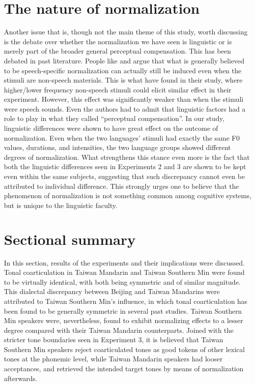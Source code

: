 \section{The nature of normalization}\label{section:General perceptual compensation vs. speech-specific normalization}

\vspace{2cm}
\vspace{-2cm}

Another issue that is, though not the main theme of this study, worth discussing is the debate over whether the normalization we have seen is linguistic or is merely part of the broader general perceptual compensation. This has been debated in past literature. People like \cite{WatkinsMakin1994} and \cite{Zhangetal2022} argue that what is generally believed to be speech-specific normalization can actually still be induced even when the stimuli are non-speech materials. This is what \citeauthor{Zhangetal2022} have found in their study, where higher/lower frequency non-speech stimuli could elicit similar effect in their experiment. However, this effect was significantly weaker than when the stimuli were speech sounds. Even the authors had to admit that linguistic factors had a role to play in what they called ``perceptual compensation''. In our study, linguistic differences were shown to have great effect on the outcome of normalization. Even when the two languages' stimuli had exactly the same F0 values, durations, and intensities, the two language groups showed different degrees of normalization. What strengthens this stance even more is the fact that both the linguistic differences seen in Experiments 2 and 3 are shown to be kept even within the same subjects, suggesting that such discrepancy cannot even be attributed to individual difference. This strongly urges one to believe that the phenomenon of normalization is not something common among cognitive systems, but is unique to the linguistic faculty.

\section{Sectional summary}
In this section, results of the experiments and their implications were discussed. Tonal coarticulation in Taiwan Mandarin and Taiwan Southern Min were found to be virtually identical, with both being symmetric and of similar magnitude. This dialectal discrepancy between Beijing and Taiwan Mandarins were attributed to Taiwan Southern Min's influence, in which tonal coarticulation has been found to be generally symmetric in several past studies. Taiwan Southern Min speakers were, nevertheless, found to exhibit normalizing effects to a lesser degree compared with their Taiwan Mandarin counterparts. Joined with the stricter tone boundaries seen in Experiment 3, it is believed that Taiwan Southern Min speakers reject coarticulated tones as good tokens of other lexical tones at the phonemic level, while Taiwan Mandarin speakers had looser acceptances, and retrieved the intended target tones by means of normalization afterwards.

